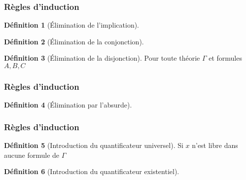 \documentclass[11pt,a4paper]{beamer}
\theoremstyle{plain}
\theoremstyle{definition}
\newtheorem{defn}{Définition}[section]
\theoremstyle{remark}
\begin{document}
\begin{frame}
\frametitle{Règles d'induction}
\begin{defn}[Élimination de l'implication]
\begin{prooftree}
\end{prooftree}
\end{defn}

\begin{defn}[Élimination de la conjonction]
\begin{prooftree}
\end{prooftree}
\end{defn}

\begin{defn}[Élimination de la disjonction]
Pour toute théorie $\Gamma$ et formules $A, B, C$
\begin{prooftree}
\end{prooftree}
\end{defn}
\end{frame}

\begin{frame}
\frametitle{Règles d'induction}
\begin{defn}[Élimination par l'absurde]
\begin{prooftree}
\end{prooftree}
\end{defn}
\end{frame}

\begin{frame}
\frametitle{Règles d'induction}
\begin{defn}[Introduction du quantificateur universel]
Si $x$ n'est libre dans aucune formule de $\Gamma$
\begin{prooftree}
\end{prooftree}
\end{defn}

\begin{defn}[Introduction du quantificateur existentiel]
\begin{prooftree}
\end{prooftree}
\end{defn}
\end{frame}
\end{document}
